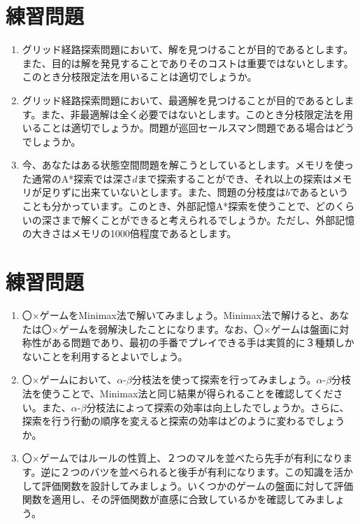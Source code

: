 \section{練習問題}

\begin{enumerate}
	\item グリッド経路探索問題において、解を見つけることが目的であるとします。また、目的は解を発見することでありそのコストは重要ではないとします。このとき分枝限定法を用いることは適切でしょうか。

	\item グリッド経路探索問題において、最適解を見つけることが目的であるとします。また、非最適解は全く必要ではないとします。このとき分枝限定法を用いることは適切でしょうか。問題が巡回セールスマン問題である場合はどうでしょうか。

	\item 今、あなたはある状態空間問題を解こうとしているとします。メモリを使った通常のA*探索では深さ$d$まで探索することができ、それ以上の探索はメモリが足りずに出来ていないとします。また、問題の分枝度は$b$であるということも分かっています。このとき、外部記憶A*探索を使うことで、どのくらいの深さまで解くことができると考えられるでしょうか。ただし、外部記憶の大きさはメモリの1000倍程度であるとします。
\end{enumerate}


\section{練習問題}

\begin{enumerate}
    \item 〇×ゲームをMinimax法で解いてみましょう。Minimax法で解けると、あなたは〇×ゲームを弱解決したことになります。なお、〇×ゲームは盤面に対称性がある問題であり、最初の手番でプレイできる手は実質的に３種類しかないことを利用するとよいでしょう。

    \item 〇×ゲームにおいて、$\alpha$-$\beta$分枝法を使って探索を行ってみましょう。$\alpha$-$\beta$分枝法を使うことで、Minimax法と同じ結果が得られることを確認してください。また、$\alpha$-$\beta$分枝法によって探索の効率は向上したでしょうか。さらに、探索を行う行動の順序を変えると探索の効率はどのように変わるでしょうか。

    \item 〇×ゲームではルールの性質上、２つのマルを並べたら先手が有利になります。逆に２つのバツを並べられると後手が有利になります。この知識を活かして評価関数を設計してみましょう。いくつかのゲームの盤面に対して評価関数を適用し、その評価関数が直感に合致しているかを確認してみましょう。
\end{enumerate}




